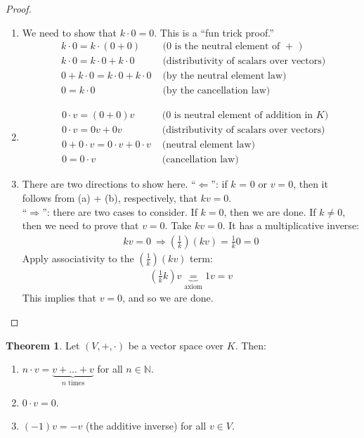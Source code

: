 \documentclass[11pt]{scrartcl}
\theoremstyle{definition}
\newtheorem{theorem}{Theorem}
\theoremstyle{remark}
\begin{document}
\begin{proof}
	\begin{enumerate}[noitemsep]
		\item We need to show that $k \cdot 0 =0$. This is a ``fun trick proof.'' 
		\begin{align*}
			& k \cdot 0 = k \cdot (0 + 0) & \text{ ($0$ is the neutral element of $+$ ) } \\
			& k \cdot 0 = k \cdot 0 + k \cdot 0  & \text{ (distributivity of scalars over vectors) } \\
			& 0 + k \cdot 0 = k \cdot 0 + k \cdot 0  & \text{ (by the neutral element law) } \\
			& 0  = k \cdot 0 & \text{ (by the cancellation law) } 
		\end{align*}
		\item 
		\begin{align*}
			 & 0 \cdot v = (0 + 0) v & \text{ ($0$ is neutral element of addition in $K$)} \\
			 & 0 \cdot v = 0 v + 0 v & \text{ (distributivity of scalars over vectors)} \\
			 & 0 + 0 \cdot v = 0 \cdot v + 0 \cdot v & \text{ (neutral element law) } \\
			 & 0 = 0 \cdot v & \text{ (cancellation law)}
		\end{align*}
		\item There are two directions to show here.
		\newline 
	``$\Leftarrow $'': if $k$ = 0 or $v =0$, then it follows from (a) + (b), respectively, that $kv =0$.   \\
	``$\Rightarrow$'': there are two cases to consider. If $k=0$, then we are done. If $k \neq 0$, then we need to prove that $v=0$. Take $kv =0$. It has a multiplicative inverse: 
		\begin{align*}
			kv = 0\ \Rightarrow \left( \frac{1}{k} \right) (kv) = \frac{1}{k} 0 = 0 
		\end{align*}
		Apply associativity to the $\left( \frac{1}{k} \right) (kv)$ term: 
		\begin{align*}
			\left( \frac{1}{k} k \right) v \underbrace{=}_{\text{axiom}} 1v = v  
		\end{align*}
		This implies that $v=0$, and so we are done. 
	\end{enumerate}
\end{proof}

\begin{theorem}
	Let $(V, +, \cdot)$ be a vector space over $K$. Then: 
	\begin{enumerate}[noitemsep]
		\item $n \cdot v = \underbrace{v + ... + v}_{\text{$n$ times}}$ for all $n \in \mathbb{N}$. 
		\item $0 \cdot v =0$. 
		\item $(-1)v = -v$ (the additive inverse) for all $v \in V$. 
	\end{enumerate}
\end{theorem}
\end{document}
